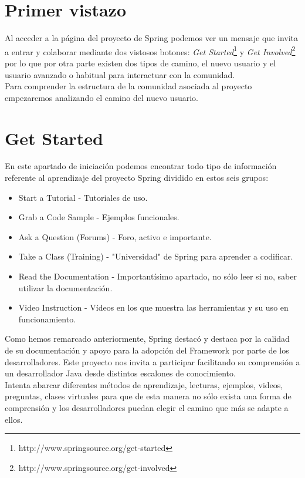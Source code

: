 \documentclass[11pt]{scrartcl}
\begin{document}
\section{Primer vistazo}

Al acceder a la p\'agina del proyecto de Spring podemos ver un mensaje que invita a entrar y colaborar mediante dos vistosos botones: \emph{Get Started}\footnote{http://www.springsource.org/get-started} y \emph{Get Involved}\footnote{http://www.springsource.org/get-involved} por lo que por otra parte existen dos tipos de camino, el nuevo usuario y el usuario avanzado o habitual para interactuar con la comunidad.\\

Para comprender la estructura de la comunidad asociada al proyecto empezaremos analizando el camino del nuevo usuario.

\section{Get Started}

En este apartado de iniciaci\'on podemos encontrar todo tipo de informaci\'on referente al aprendizaje del proyecto Spring dividido en estos seis grupos:

\begin{itemize}

	\item Start a Tutorial - Tutoriales de uso.
    \item Grab a Code Sample - Ejemplos funcionales.
    \item Ask a Question (Forums) - Foro, activo e importante.
    \item Take a Class (Training) - "Universidad" de Spring para aprender a codificar.
    \item Read the Documentation - Important\'isimo apartado, no s\'olo leer si no, saber utilizar la documentaci\'on.
    \item Video Instruction - V\'ideos en los que muestra las herramientas y su uso en funcionamiento.
\end{itemize}

Como hemos remarcado anteriormente, Spring destac\'o y destaca por la calidad de su documentaci\'on y apoyo para la adopci\'on del Framework por parte de los desarrolladores.
Este proyecto nos invita a participar facilitando su comprensi\'on a un desarrollador Java desde distintos escalones de conocimiento.\\

Intenta abarcar diferentes m\'etodos de aprendizaje, lecturas, ejemplos, videos, preguntas, clases virtuales para que de esta manera no s\'olo exista una forma de comprensi\'on y los desarrolladores puedan elegir el camino que m\'as se adapte a ellos.\\
\end{document}
